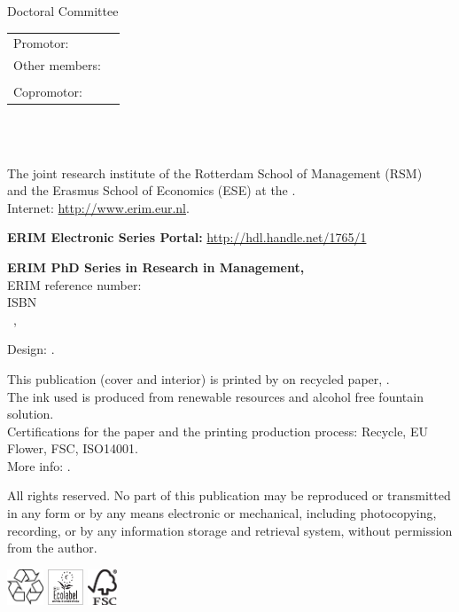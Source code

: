 \thispagestyle{empty}
\noindent Doctoral Committee\\
{\setlength{\tabcolsep}{0pt}
\begin{tabular}{ll}
	\rule{0pt}{2em}Promotor: & \qquad\MyPromotor \\
	\rule{0pt}{2em}Other members: & \qquad\MyMemberOne \\
	& \qquad\MyMemberTwo \\
	\rule{0pt}{2em}Copromotor: & \qquad\MyCoPromotor\\
\end{tabular}
}\\
\vfill
{\footnotesize\parindent0pt
\textbf{\MyInstitute}\\
The joint research institute of the Rotterdam School of Management (RSM)\\
and the Erasmus School of Economics (ESE) at the \MyUniversity.\\
Internet: \url{http://www.erim.eur.nl}.\par
\emptyline
\textbf{ERIM Electronic Series Portal:} \url{http://hdl.handle.net/1765/1}\par
\emptyline
\textbf{ERIM PhD Series in Research in Management, \MyERIMThesisIndex}\\
ERIM reference number: \MyERIMThesisReference\\
ISBN \MyISBN\\
\textcopyright\, \MyYear, \MyAuthor\par
\emptyline
Design: \MyDesigner.\par
\emptyline
This publication (cover and interior) is printed by \MyPrinter{} on recycled 
paper, \MyPaperType.\\
The ink used is produced from renewable resources and alcohol free fountain 
solution.\\
Certifications for the paper and the printing production process: Recycle, EU 
Flower, FSC, ISO14001.\\
More info: \MyPrinterURL.\par
\emptyline
All rights reserved. No part of this publication may be reproduced or 
transmitted in any form or by any means electronic or mechanical, including 
photocopying, recording, or by any information storage and retrieval system, 
without permission from the author.\par
\emptyline
\emptyline
\includegraphics[height=10.6mm]{./images/recycle}\qquad
\includegraphics[height=10.6mm]{./images/ecolabel}\qquad
\includegraphics[height=10.6mm]{./images/fsc}
}

